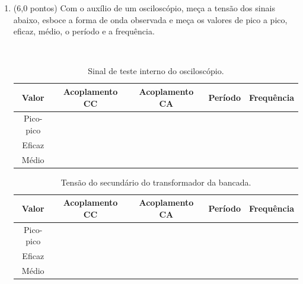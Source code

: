 \documentclass[11pt]{article} %
\begin{document}
\begin{enumerate}
\item (6,0 pontos) Com o auxílio de um osciloscópio, meça a tensão dos sinais abaixo, esboce a forma de onda observada e meça os valores de pico a pico, eficaz, médio, o período e a frequência.

\begin{enumerate}
\end{enumerate}

\begin{figure}[!h]
\begin{subfigure}[b]{.45\textwidth}
\centering
{}
\end{subfigure}
~
\begin{subfigure}[b]{.45\textwidth}
\centering
{}
\end{subfigure}
\end{figure}

\begin{table}[!h]
\centering
\caption{Sinal de teste interno do osciloscópio.}
\begin{tabular}{|c|c|c|c|c|}
\hline
Valor & Acoplamento CC & Acoplamento CA & Período & Frequência\\\hline
Pico-pico & & & & \\\cline{1-3}
Eficaz & & & & \\\cline{1-3}
Médio & & & & \\\hline
\end{tabular}
\end{table}

\begin{table}[!h]
\centering
\caption{Tensão do secundário do transformador da bancada.}
\begin{tabular}{|c|c|c|c|c|}
\hline
Valor & Acoplamento CC & Acoplamento CA & Período & Frequência\\\hline
Pico-pico & & & & \\\cline{1-3}
Eficaz & & & & \\\cline{1-3}
Médio & & & & \\\hline
\end{tabular}
\end{table}

\end{enumerate}
\end{document}
